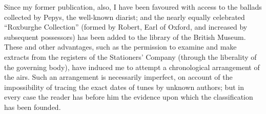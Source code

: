Since my former publication, also, I have been favoured with access to the
ballads collected by Pepys, the well-known diarist; and the nearly equally celebrated
“Roxburghe Collection” (formed by Robert, Earl of Oxford, and increased
by subsequent possessors) has been added to the library of the British Museum.
These and other advantages, such as the permission to examine and make extracts
from the registers of the Stationers’ Company (through the liberality of the
governing body), have induced me to attempt a chronological arrangement of the
airs. Such an arrangement is necessarily imperfect, on account of the impossibility
of tracing the exact dates of tunes by unknown authors; but in every case
the reader has before him the evidence upon which the classification has been
founded.  

\pagebreak
